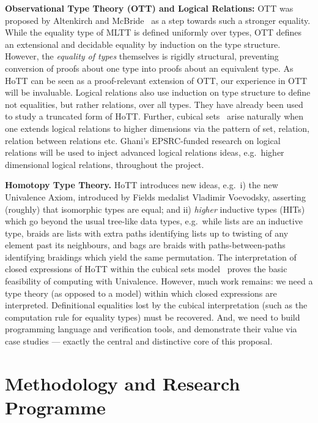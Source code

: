 \documentclass[a4paper,11pt]{article}
\newcommand{\eg}{{e.g.}\ }
\begin{document}
{\bf Observational Type Theory (OTT) and Logical Relations:} OTT was
proposed by Altenkirch and McBride~\cite{alti:ott-conf} as a step
towards such a stronger equality. While the equality type of MLTT is
defined uniformly over types, OTT defines an extensional and decidable
equality by induction on the type structure. However, the {\em
  equality of types} themselves is rigidly structural, preventing
conversion of proofs about one type into proofs about an equivalent
type. As HoTT can be seen as a proof-relevant extension of OTT, our
experience in OTT will be invaluable. Logical relations also use
induction on type structure to define not equalities, but rather
relations, over all types. They have already been
used~\cite{licataHarper:canonicity2d} to study a truncated form of
HoTT. Further, cubical sets~\cite{BezemM:cubsmt} arise naturally when
one extends logical relations to higher dimensions via the pattern of
set, relation, relation between relations etc. Ghani's EPSRC-funded
research on logical relations will be used to inject advanced logical
relations ideas, \eg higher dimensional logical relations, throughout
the project.


{\bf Homotopy Type Theory.} HoTT introduces new ideas, \eg i) the new
Univalence Axiom, introduced by Fields medalist Vladimir Voevodsky,
asserting (roughly) that isomorphic types are equal; and ii)
\emph{higher} inductive types (HITs) which go beyond the usual
tree-like data types, \eg while lists are an inductive type, braids
are lists with extra paths identifying lists up to twisting of any
element past its neighbours, and bags are braids with
paths-between-paths identifying braidings which yield the same
permutation.  The interpretation of closed expressions of HoTT within
the cubical sets model~\cite{BezemM:cubsmt, nominal} proves the basic
feasibility of computing with Univalence.  However, much work remains:
we need a type theory (as opposed to a model) within which closed
expressions are interpreted.  Definitional equalities lost by the
cubical interpretation (such as the computation rule for equality
types) must be recovered. And, we need to build programming
language and verification tools, and demonstrate their value via case
studies --- exactly the central and distinctive core of this proposal.




\vspace*{-0.2in}

\section{Methodology and Research Programme}
\vspace*{-0.1in}
\end{document}
